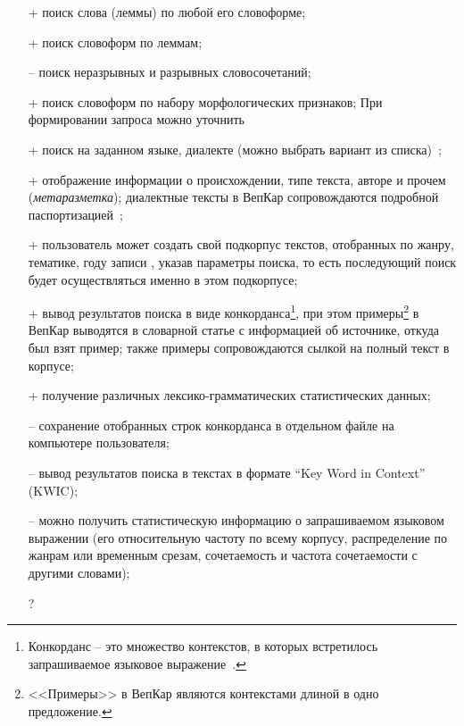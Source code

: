\begin{itemize}
    \item[+] поиск слова (леммы) по любой его словоформе;
    \item[+] поиск словоформ по леммам;
    \item[--] поиск неразрывных и разрывных словосочетаний;
    \item[+] поиск словоформ по набору морфологических признаков;
При формировании запроса можно уточнить 
    \item[+] поиск на заданном языке, диалекте (можно выбрать вариант из списка)~\cite{KrizhanovskyCorpora2019Dialects};
    \item[+] отображение информации о происхождении, типе текста, авторе и прочем (\emph{метаразметка}); 
        диалектные тексты в ВепКар сопровождаются подробной паспортизацией~\cite{Krizhanovsky2019Architecture};
    \item[+] пользователь может создать свой подкорпус текстов, 
        отобранных по жанру, тематике, году записи , 
        указав параметры поиска, 
        то есть последующий поиск будет осуществляться именно в этом подкорпусе;
    
    \item[+] вывод результатов поиска в виде конкорданса\footnote{
            Конкорданс -- это множество контекстов, 
            в которых встретилось запрашиваемое языковое выражение~\cite[с.~415]{Kibrik2019}.
        }, при этом примеры\footnote{<<Примеры>> 
                                        в ВепКар являются контекстами 
                                        длиной в одно предложение.} 
                в ВепКар выводятся в словарной статье с информацией об источнике, откуда был взят пример; 
                также примеры сопровождаются сылкой на полный текст в корпусе;
    \item[+] получение различных лексико-грамматических статистических данных;
    \item[--] сохранение отобранных строк конкорданса в отдельном файле на компьютере пользователя;
    \item[--] вывод результатов поиска в текстах в формате ``Key Word in Context'' (KWIC);
    \item[--] можно получить статистическую информацию 
        о запрашиваемом языковом выражении (его относительную частоту по всему корпусу,
        распределение по жанрам или временным срезам, сочетаемость и частота сочетаемости с другими словами);
        
    \item[?] 
\end{itemize}

